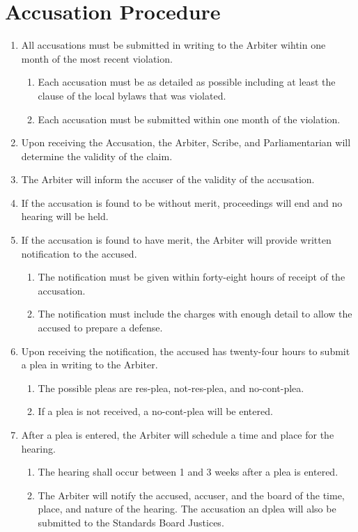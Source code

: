 \section{Accusation Procedure}

	\begin{enumerate}
		\item All accusations must be submitted in writing to the Arbiter wihtin one month of the most recent violation.
			\begin{enumerate}
				\item Each accusation must be as detailed as possible including at least the clause of the local bylaws that was violated.
				\item Each accusation must be submitted within one month of the violation.
			\end{enumerate}

		\item Upon receiving the Accusation, the Arbiter, Scribe, and Parliamentarian will determine the validity of the claim.
		\item The Arbiter will inform the accuser of the validity of the accusation.
		\item If the accusation is found to be without merit, proceedings will end and no hearing will be held.
		\item If the accusation is found to have merit, the Arbiter will provide written notification to the accused.
			\begin{enumerate}
				\item The notification must be given within forty-eight hours of receipt of the accusation.
				\item The notification must include the charges with enough detail to allow the accused to prepare a defense.
			\end{enumerate}
		\item Upon receiving the notification, the accused has twenty-four hours to submit a plea in writing to the Arbiter.
			\begin{enumerate}
				\item The possible pleas are \gls{res-plea}, \gls{not-res-plea}, and \gls{no-cont-plea}.
				\item If a plea is not received, a \gls{no-cont-plea} will be entered.
			\end{enumerate}

		\item After a plea is entered, the Arbiter will schedule a time and place for the hearing.
			\begin{enumerate}
				\item The hearing shall occur between 1 and 3 weeks after a plea is entered.
				\item The Arbiter will notify the accused, accuser, and the board of the time, place, and nature of the hearing. The accusation an dplea will also be submitted to the Standards Board Justices.
			\end{enumerate}


\end{enumerate}
